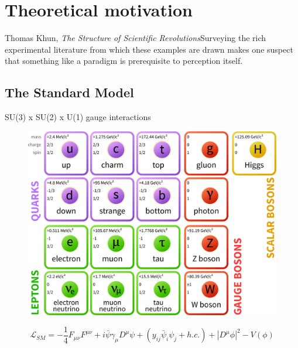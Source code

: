 \chapter{Theoretical motivation}

\begin{chapquote}{Thomas Khun, \emph{The Structure of Scientific Revolutions}}{Surveying the rich experimental literature from which these examples are drawn makes one suspect that something like a paradigm is prerequisite to perception itself.}
\end{chapquote}

\section{The Standard Model}

SU(3) x SU(2) x U(1) gauge interactions

\begin{figure}
\centering
\includegraphics[width=.7\textwidth]{figures/intro/SM-Particles.png}
\caption{\cite{wiki-sm}}
\label{fig:SM-Particles}
\end{figure}

\begin{equation}
\mathcal{L}_{SM} =  - \frac{1}{4} F_{\mu \nu} F^{\mu \nu} + i \bar{\psi} \gamma_\mu D^\mu \psi + \left( y_{ij} \bar{\psi}_i \psi_j + h.c. \right) + |D^\mu \phi|^2 - V (\phi)
\label{eq:sm}
\end{equation}


